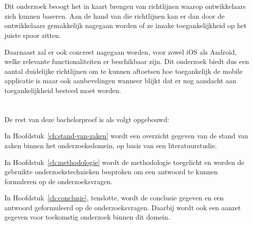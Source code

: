 
\section{}
\label{sec:onderzoeksdoelstelling}


Dit onderzoek beoogt het in kaart brengen van richtlijnen waarop ontwikkelaars zich kunnen baseren. Aan de hand van die richtlijnen kan er dan door de ontwikkelaars gemakkelijk nagegaan worden of ze inzake toegankelijkheid op het juiste spoor zitten.

Daarnaast zal er ook concreet nagegaan worden, voor zowel iOS als Android, welke relevante functionaliteiten er beschikbaar zijn.
Dit onderzoek biedt dus een aantal duidelijke richtlijnen om te kunnen aftoetsen hoe toegankelijk de mobile applicatie is  maar ook aanbevelingen wanneer blijkt dat er nog aandacht aan toegankelijkheid besteed moet worden.

\section{}
\label{sec:opzet-bachelorproef}


De rest van deze bachelorproef is als volgt opgebouwd:

In Hoofdstuk~\ref{ch:stand-van-zaken} wordt een overzicht gegeven van de stand van zaken binnen het onderzoeksdomein, op basis van een literatuurstudie.

In Hoofdstuk~\ref{ch:methodologie} wordt de methodologie toegelicht en worden de gebruikte onderzoekstechnieken besproken om een antwoord te kunnen formuleren op de onderzoeksvragen.


In Hoofdstuk~\ref{ch:conclusie}, tenslotte, wordt de conclusie gegeven en een antwoord geformuleerd op de onderzoeksvragen. Daarbij wordt ook een aanzet gegeven voor toekomstig onderzoek binnen dit domein.